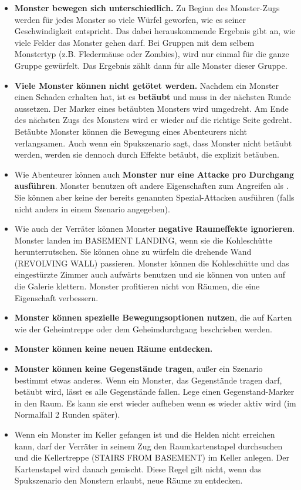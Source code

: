   \begin{itemize}
    \item \textbf{Monster bewegen sich unterschiedlich.} Zu Beginn des Monster-Zugs werden für jedes Monster so viele Würfel geworfen, wie es seiner Geschwindigkeit entspricht. Das dabei herauskommende Ergebnis gibt an, wie viele Felder das Monster gehen darf. Bei Gruppen mit dem selbem Monstertyp (z.B. Fledermäuse oder Zombies), wird nur einmal für die ganze Gruppe gewürfelt. Das Ergebnis zählt dann für alle Monster dieser Gruppe.
    \item \textbf{Viele Monster können nicht getötet werden.} Nachdem ein Monster einen Schaden erhalten hat, ist es \textbf{betäubt} und muss in der nächsten Runde aussetzen. Der Marker eines betäubten Monsters wird umgedreht. Am Ende des nächsten Zugs des Monsters wird er wieder auf die richtige Seite gedreht. Betäubte Monster können die Bewegung eines Abenteurers nicht verlangsamen. Auch wenn ein Spukszenario sagt, dass Monster nicht betäubt werden, werden sie dennoch durch Effekte betäubt, die explizit betäuben.
    \item Wie Abenteurer können auch \textbf{Monster nur eine Attacke pro Durchgang ausführen}. Monster benutzen oft andere Eigenschaften zum Angreifen als \might. Sie können aber keine der bereits genannten Spezial-Attacken ausführen (falls nicht anders in einem Szenario angegeben).
    \item Wie auch der Verräter können Monster \textbf{negative Raumeffekte ignorieren}. Monster landen im BASEMENT LANDING, wenn sie die Kohleschütte herunterrutschen. Sie können ohne zu würfeln die drehende Wand (REVOLVING WALL) passieren. Monster können die Kohleschütte und das eingestürzte Zimmer auch aufwärts benutzen und sie können von unten auf die Galerie klettern. Monster profitieren nicht von Räumen, die eine Eigenschaft verbessern.
    \item \textbf{Monster können spezielle Bewegungsoptionen nutzen}, die auf Karten wie der Geheimtreppe oder dem Geheimdurchgang beschrieben werden.
    \item \textbf{Monster können keine neuen Räume entdecken.}
    \item \textbf{Monster können keine Gegenstände tragen}, außer ein Szenario bestimmt etwas anderes. Wenn ein Monster, das Gegenstände tragen darf, betäubt wird, lässt es alle Gegenstände fallen. Lege einen Gegenstand-Marker in den Raum. Es kann sie erst wieder aufheben wenn es wieder aktiv wird (im Normalfall 2 Runden später).
    \item Wenn ein Monster im Keller gefangen ist und die Helden nicht erreichen kann, darf der Verräter in seinem Zug den Raumkartenstapel durchsuchen und die Kellertreppe (STAIRS FROM BASEMENT) im Keller anlegen. Der Kartenstapel wird danach gemischt. Diese Regel gilt nicht, wenn das Spukszenario den Monstern erlaubt, neue Räume zu entdecken.
  \end{itemize}

